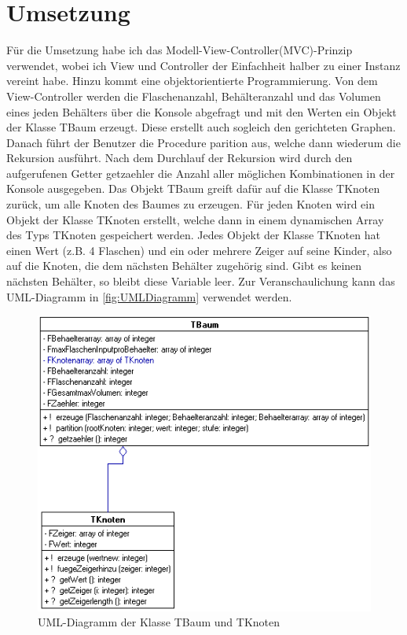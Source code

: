 \documentclass[10pt,a4paper]{scrartcl}
\begin{document}
\section{Umsetzung}
Für die Umsetzung habe ich das Modell-View-Controller(MVC)-Prinzip verwendet, wobei ich View und Controller der Einfachheit halber zu einer Instanz vereint habe. Hinzu kommt eine objektorientierte Programmierung. Von dem View-Controller werden die Flaschenanzahl, Behälteranzahl und das Volumen eines jeden Behälters über die Konsole abgefragt und mit den Werten ein Objekt der Klasse TBaum erzeugt. Diese erstellt auch sogleich den gerichteten Graphen. Danach führt der Benutzer die Procedure \glqq{}parition\grqq{} aus, welche dann wiederum die Rekursion ausführt. Nach dem Durchlauf der Rekursion wird durch den aufgerufenen Getter \glqq{}getzaehler\grqq{} die Anzahl aller möglichen Kombinationen in der Konsole ausgegeben. Das Objekt TBaum greift dafür auf die Klasse TKnoten zurück, um alle Knoten des Baumes zu erzeugen. Für jeden Knoten wird ein Objekt der Klasse TKnoten erstellt, welche dann in einem dynamischen Array des Typs TKnoten gespeichert werden. Jedes Objekt der Klasse TKnoten hat einen Wert (z.B. 4 Flaschen) und ein oder mehrere Zeiger auf seine \glqq{}Kinder\grqq{}, also auf die Knoten, die dem nächsten Behälter zugehörig sind. Gibt es keinen nächsten Behälter, so bleibt diese Variable leer. Zur Veranschaulichung kann das UML-Diagramm in \autoref{fig:UMLDiagramm} verwendet werden.\\
\begin{figure}
	\centering
	\caption{UML-Diagramm der Klasse TBaum und TKnoten}
	\label{fig:UMLDiagramm}
	\includegraphics[]{UML.png}
\end{figure}
\end{document}
